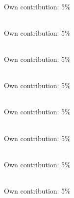 \noindent{}\\ \strut \hfill Own contribution: 5\%\\

\noindent{}\\ \strut \hfill Own contribution: 5\%\\

\noindent{}\\ \strut \hfill Own contribution: 5\%\\

\noindent{}\\ \strut \hfill Own contribution: 5\%\\

\noindent{}\\ \strut \hfill Own contribution: 5\%\\

\noindent{}\\ \strut \hfill Own contribution: 5\%\\


\noindent{}\\ \strut \hfill Own contribution: 5\%\\


\noindent{}\\ \strut \hfill Own contribution: 5\%\\



